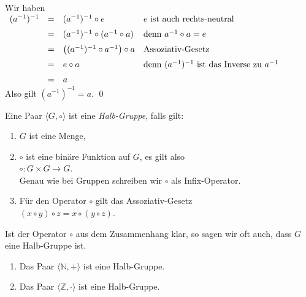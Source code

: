 \proof
Wir haben
\\[0.2cm]
\hspace*{1.3cm}
$
\begin{array}[t]{lcll}
  (a^{-1})^{-1} & = & (a^{-1})^{-1} \circ e
                    & \mbox{$e$ ist auch rechts-neutral}                      \\[0.2cm]
                & = & (a^{-1})^{-1} \circ (a^{-1} \circ a)
                    & \mbox{denn $a^{-1} \circ a = e$}                        \\[0.2cm]
                & = & \bigl((a^{-1})^{-1} \circ a^{-1}\bigr) \circ a
                    & \mbox{Assoziativ-Gesetz}                                \\[0.2cm]
                & = & e \circ a
                    & \mbox{denn $(a^{-1})^{-1}$ ist das Inverse zu $a^{-1}$} \\[0.2cm]
                & = & a
\end{array}
$
\\[0.2cm]
Also gilt $(a^{-1})^{-1} = a$. \qed


\begin{Definition}
  Eine Paar $\langle G, \circ \rangle$ ist eine \emph{Halb-Gruppe}, falls gilt:
  \begin{enumerate}
  \item $G$ ist eine Menge,
  \item $\circ$ ist eine binäre Funktion auf $G$, es gilt also
        \\[0.2cm]
        \hspace*{1.3cm}
        $\circ: G \times G \rightarrow G$.
        \\[0.2cm]
        Genau wie bei Gruppen schreiben wir $\circ$ als Infix-Operator.
  \item Für den Operator $\circ$ gilt das Assoziativ-Gesetz
        \\[0.2cm]
        \hspace*{1.3cm}
        $(x \circ y) \circ z = x \circ (y \circ z)$.
  \end{enumerate}
  Ist der Operator $\circ$ aus dem Zusammenhang klar, so sagen wir oft auch,
  dass $G$ eine Halb-Gruppe ist.
\end{Definition}

\examples
\begin{enumerate}
\item Das Paar $\langle \mathbb{N}, + \rangle$ ist eine Halb-Gruppe.
\item Das Paar $\langle \mathbb{Z}, \cdot \rangle$ ist eine Halb-Gruppe.
\end{enumerate}

